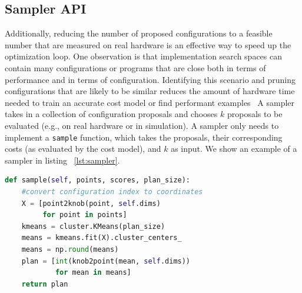 \subsection{Sampler API}
Additionally, reducing the number of proposed configurations to a feasible number that are measured on real hardware is an effective way to speed up the optimization loop.
One observation is that implementation search spaces can contain many configurations or programs that are close both in terms of performance and in terms of configuration.
Identifying this scenario and pruning configurations that are likely to be similar reduces the amount of hardware time needed to train an accurate cost model or find performant examples~\cite{DBLP:journals/corr/abs-1905-12799}
A sampler takes in a collection of configuration proposals and chooses $k$ proposals to be evaluated (e.g., on real hardware or in simulation).
A sampler only needs to implement a \texttt{sample} function, which takes the proposals, their corresponding costs (as evaluated by the cost model), and $k$ as input.
We show an example of a sampler in listing ~\autoref{lst:sampler}.

\begin{lstlisting}[caption={Example of a $k$-means clustering based sampler that attempts to achieve sample diversity. Points refers to the current proposed set of configurations, scores are their corresponding scores as given by a cost model, and the plan size is the number of points (configurations) that should be selected for measurement.},label={lst:sampler},language=Python,float,floatplacement=H]
def sample(self, points, scores, plan_size):
    #convert configuration index to coordinates
    X = [point2knob(point, self.dims)
         for point in points]
    kmeans = cluster.KMeans(plan_size)
    means = kmeans.fit(X).cluster_centers_
    means = np.round(means)
    plan = [int(knob2point(mean, self.dims))
            for mean in means]
    return plan
\end{lstlisting}



%

